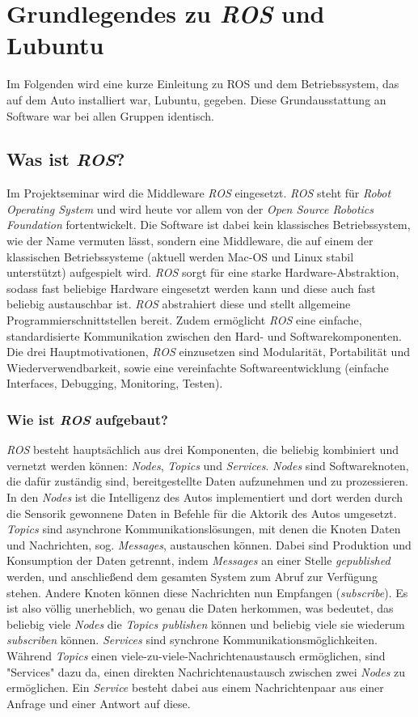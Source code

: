 \section{Grundlegendes zu \textit{ROS} und Lubuntu}
\label{sec:grundlegendesROS-OS}   
Im Folgenden wird eine kurze Einleitung zu ROS und dem Betriebssystem, das auf dem Auto installiert war, Lubuntu, gegeben. Diese Grundausstattung an Software war bei allen Gruppen identisch.
\subsection{Was ist \textit{ROS}?}
Im Projektseminar wird die Middleware \textit{ROS} eingesetzt. \textit{ROS} steht für \textit{Robot Operating System} und wird heute vor allem von der \textit{Open Source Robotics Foundation} fortentwickelt. Die Software ist dabei kein klassisches Betriebssystem, wie der Name vermuten lässt, sondern eine Middleware, die auf einem der klassischen Betriebssysteme (aktuell werden Mac-OS und Linux stabil unterstützt) aufgespielt wird. \textit{ROS} sorgt für eine starke Hardware-Abstraktion, sodass fast beliebige Hardware eingesetzt werden kann und diese auch fast beliebig austauschbar ist. \textit{ROS} abstrahiert diese und stellt allgemeine Programmierschnittstellen bereit. Zudem ermöglicht \textit{ROS} eine einfache, standardisierte Kommunikation zwischen den Hard- und Softwarekomponenten.
Die drei Hauptmotivationen, \textit{ROS} einzusetzen sind Modularität, Portabilität und Wiederverwendbarkeit, sowie eine vereinfachte Softwareentwicklung (einfache Interfaces, Debugging, Monitoring, Testen).

\subsubsection{Wie ist \textit{ROS} aufgebaut?}
\textit{ROS} besteht hauptsächlich aus drei Komponenten, die beliebig kombiniert und vernetzt werden können: \textit{Nodes}, \textit{Topics} und \textit{Services}. \textit{Nodes} sind Softwareknoten, die dafür zuständig sind, bereitgestellte Daten aufzunehmen und zu prozessieren. In den \textit{Nodes} ist die Intelligenz des Autos implementiert und dort werden durch die Sensorik gewonnene Daten in Befehle für die Aktorik des Autos umgesetzt. 
\textit{Topics} sind asynchrone Kommunikationslösungen, mit denen die Knoten Daten und Nachrichten, sog. \textit{Messages}, austauschen können. Dabei sind Produktion und Konsumption der Daten getrennt, indem \textit{Messages} an einer Stelle \textit{gepublished} werden, und anschließend dem gesamten System zum Abruf zur Verfügung stehen. Andere Knoten können diese Nachrichten nun Empfangen (\textit{subscribe}). Es ist also völlig unerheblich, wo genau die Daten herkommen, was bedeutet, das beliebig viele \textit{Nodes} die \textit{Topics publishen} können und beliebig viele sie wiederum \textit{subscriben} können. 
\textit{Services} sind synchrone Kommunikationsmöglichkeiten. Während \textit{Topics} einen viele-zu-viele-Nachrichtenaustausch ermöglichen, sind "Services" dazu da, einen direkten Nachrichtenaustausch zwischen zwei \textit{Nodes} zu ermöglichen. Ein \textit{Service} besteht dabei aus einem Nachrichtenpaar aus einer Anfrage und einer Antwort auf diese. 

